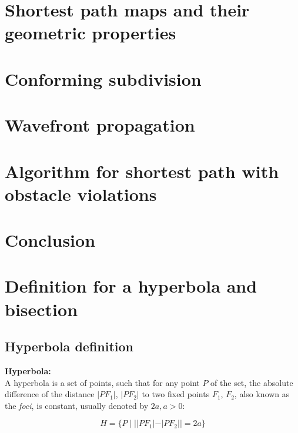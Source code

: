 \chapter{Shortest path maps and their geometric properties}



\chapter{Conforming subdivision}



\chapter{Wavefront propagation}



\chapter{Algorithm for shortest path with obstacle violations}





\chapter{Conclusion}



\newpage

\appendix

\chapter{Definition for a hyperbola and bisection}
\label{appendix:def}
\section{Hyperbola definition} 

\begin{mydef}
	\textbf{Hyperbola:} \\ 
	A hyperbola is a set of
	points, such that for any point $P$ of the set, the absolute difference of
	the distance $|PF_1|$, $|PF_2|$ to two fixed points $F_1$, $F_2$, also known
	as the \textit{foci}, is constant, usually denoted by $2a, a>0$\cite{Hyperbola}:
	
	$$H=\{P \mid ||PF_1|-|PF_2|| = 2a\}$$ 
\end{mydef}

